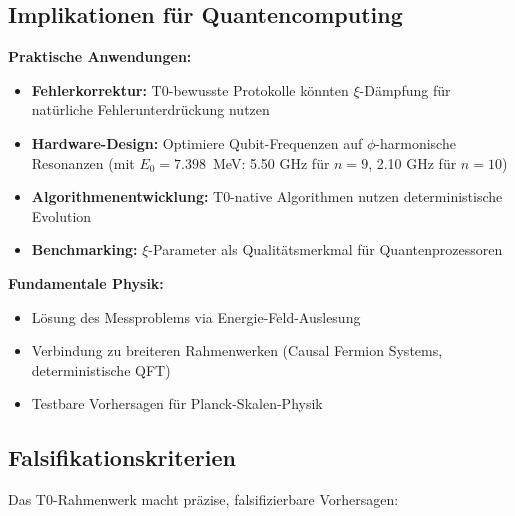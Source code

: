 \subsection{Implikationen für Quantencomputing}

\textbf{Praktische Anwendungen:}
\begin{itemize}
	\item \textbf{Fehlerkorrektur:} T0-bewusste Protokolle könnten $\xi$-Dämpfung für natürliche Fehlerunterdrückung nutzen
	\item \textbf{Hardware-Design:} Optimiere Qubit-Frequenzen auf $\phi$-harmonische Resonanzen (mit $E_0 = 7.398$~MeV: 5.50 GHz für $n = 9$, 2.10 GHz für $n = 10$)
	\item \textbf{Algorithmenentwicklung:} T0-native Algorithmen nutzen deterministische Evolution
	\item \textbf{Benchmarking:} $\xi$-Parameter als Qualitätsmerkmal für Quantenprozessoren
\end{itemize}

\textbf{Fundamentale Physik:}
\begin{itemize}
	\item Lösung des Messproblems via Energie-Feld-Auslesung
	\item Verbindung zu breiteren Rahmenwerken (Causal Fermion Systems, deterministische QFT)
	\item Testbare Vorhersagen für Planck-Skalen-Physik
\end{itemize}

\subsection{Falsifikationskriterien}

Das T0-Rahmenwerk macht präzise, falsifizierbare Vorhersagen:

